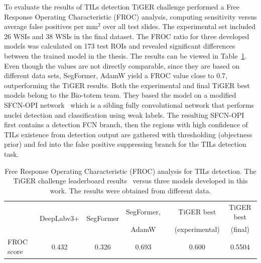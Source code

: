 To evaluate the results of TILs detection TiGER challenge performed a
Free Response Operating Characteristic (FROC) analysis, computing sensitivity
versus average false positives per mm$^2$ over all test slides.
The experimental set included 26 WSIs and 38 WSIs in the final dataset.
The FROC ratio for three developed models was calculated on 173 test ROIs
and revealed significant differences between the trained model in the thesis.
The results can be viewed in Table~\ref{tab:tils_compare}.
Even though the values are not directly comparable, since they are based on different
data sets, SegFormer, AdamW yield a FROC value close to 0.7, outperforming the TiGER results.
Both the experimental and final TiGER best models belong to the Bio-totem team.
They based the model on a modified SFCN-OPI network~\cite{zhou2018sfcn} which
is a sibling fully convolutional network that performs nuclei detection and
classification using weak labels.  The resulting SFCN-OPI first contains a
detection FCN branch, then the regions with high confidence of TILs
existence from detection output are gathered with thresholding (objectness prior)
and fed into the false positive suppressing branch for the TILs detection task. 

\begin{table}[H]
    \centering
    \begin{tabular}{ l c c c c c c }
        \hline
         & \multirow{2}{*}{DeepLabv3+} & \multirow{2}{*}{SegFormer} & SegFormer, & & TiGER best & TiGER best\\
         &  &  & AdamW & & (experimental) & (final)\\
        \hline
        FROC score & 0.432 & 0.326 & 0.693 & & 0.600 & 0.5504 \\
        \hline
    \end{tabular}
\caption{\label{tab:tils_compare} Free Response Operating Characteristic (FROC)
analysis for TILs detection. The TiGER challenge leaderboard results~\cite{home} versus three
models developed in this work. The results were obtained from different data.}
\end{table}

